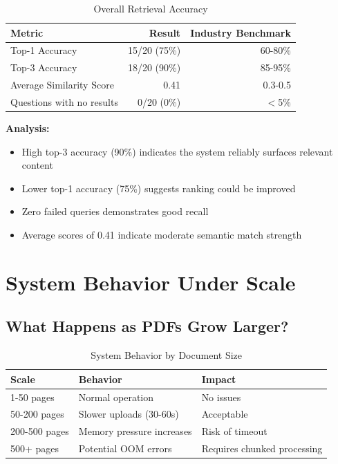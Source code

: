 \documentclass[11pt,a4paper]{article}
\begin{document}
\begin{table}[H]
\centering
\begin{tabular}{lrr}
\toprule
\textbf{Metric} & \textbf{Result} & \textbf{Industry Benchmark} \\
\midrule
Top-1 Accuracy & 15/20 (75\%) & 60-80\% \\
Top-3 Accuracy & 18/20 (90\%) & 85-95\% \\
Average Similarity Score & 0.41 & 0.3-0.5 \\
Questions with no results & 0/20 (0\%) & $<$5\% \\
\bottomrule
\end{tabular}
\caption{Overall Retrieval Accuracy}
\end{table}

\textbf{Analysis:}
\begin{itemize}
    \item High top-3 accuracy (90\%) indicates the system reliably surfaces relevant content
    \item Lower top-1 accuracy (75\%) suggests ranking could be improved
    \item Zero failed queries demonstrates good recall
    \item Average scores of 0.41 indicate moderate semantic match strength
\end{itemize}

\section{System Behavior Under Scale}

\subsection{What Happens as PDFs Grow Larger?}

\begin{table}[H]
\centering
\begin{tabular}{lll}
\toprule
\textbf{Scale} & \textbf{Behavior} & \textbf{Impact} \\
\midrule
1-50 pages & Normal operation & No issues \\
50-200 pages & Slower uploads (30-60s) & Acceptable \\
200-500 pages & Memory pressure increases & Risk of timeout \\
500+ pages & Potential OOM errors & Requires chunked processing \\
\bottomrule
\end{tabular}
\caption{System Behavior by Document Size}
\end{table}
\end{document}
